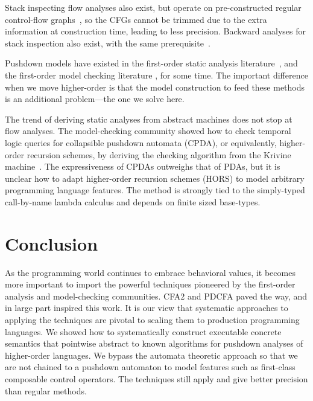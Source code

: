 Stack inspecting flow analyses also exist, but operate on pre-constructed regular control-flow graphs~\citep{ianjohnson:bartoletti2004stack}, so the CFGs cannot be trimmed due to the extra information at construction time, leading to less precision.
%
Backward analyses for stack inspection also exist, with the same prerequisite~\citep{ianjohnson:DBLP:journals/sigplan/Chang06}.

Pushdown models have existed in the first-order static analysis literature~\citep[Chapter 7]{local:muchnick:jones:flow-analysis:1981}\citep{ianjohnson:reps:pushdown:1995}, and the first-order model checking literature \citep{ianjohnson:bouajiani:esparza:pushdown:1997}, for some time.
%
The important difference when we move higher-order is that the model construction to feed these methods is an additional problem---the one we solve here.

The trend of deriving static analyses from abstract machines does not stop at flow analyses.
%
The model-checking community showed how to check temporal logic queries for collapsible pushdown automata (CPDA), or equivalently, higher-order recursion schemes, by deriving the checking algorithm from the Krivine machine~\citep{ianjohnson:Salvati:2011:KMH:2027223.2027239}.
%
The expressiveness of CPDAs outweighs that of PDAs, but it is unclear how to adapt higher-order recursion schemes (HORS) to model arbitrary programming language features.
%
The method is strongly tied to the simply-typed call-by-name lambda calculus and depends on finite sized base-types.
%

\section{Conclusion}

As the programming world continues to embrace behavioral values, it becomes more important to import the powerful techniques pioneered by the first-order analysis and model-checking communities.
%
CFA2 and PDCFA paved the way, and in large part inspired this work.
%
It is our view that systematic approaches to applying the techniques are pivotal to scaling them to production programming languages.
%
We showed how to systematically construct executable concrete semantics that pointwise abstract to known algorithms for pushdown analyses of higher-order languages.
%
We bypass the automata theoretic approach so that we are not chained to a pushdown automaton to model features such as first-class composable control operators.
%
The techniques still apply and give better precision than regular methods.

